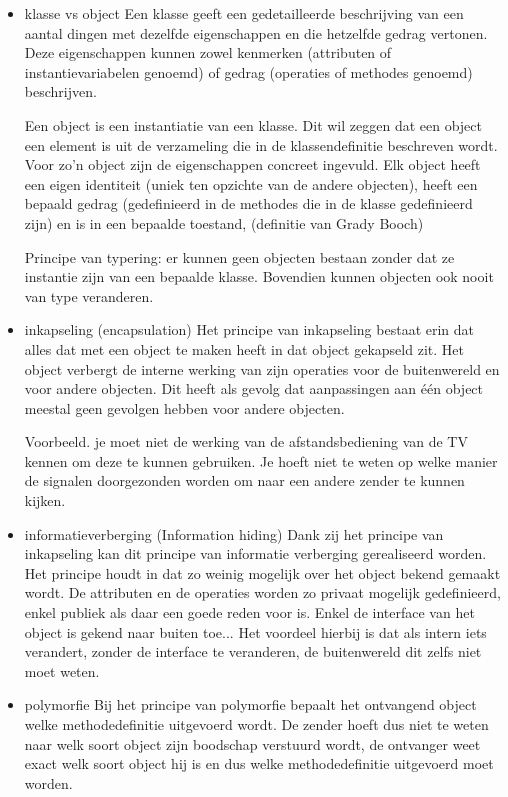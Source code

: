 \begin{itemize}
    \item klasse vs object
Een klasse geeft een gedetailleerde beschrijving van een aantal dingen met dezelfde eigenschappen en die hetzelfde gedrag vertonen. Deze eigenschappen kunnen zowel kenmerken (attributen of instantievariabelen genoemd) of gedrag (operaties of methodes genoemd) beschrijven.

Een object is een instantiatie van een klasse. Dit wil zeggen dat een object een element is uit de verzameling die in de klassendefinitie beschreven wordt. Voor zo'n object zijn de eigenschappen concreet ingevuld. Elk object heeft een eigen identiteit (uniek ten opzichte van de andere objecten), heeft een bepaald gedrag (gedefinieerd in de methodes die in de klasse gedefinieerd zijn) en is in een bepaalde toestand, (definitie van Grady Booch)

Principe van typering: er kunnen geen objecten bestaan zonder dat ze instantie zijn van een bepaalde klasse. Bovendien kunnen objecten ook nooit van type veranderen.
    \item inkapseling (encapsulation)
Het principe van inkapseling bestaat erin dat alles dat met een object te maken heeft in dat object gekapseld zit. Het object verbergt de interne werking van zijn operaties voor de buitenwereld en voor andere objecten. Dit heeft als gevolg dat aanpassingen aan één object meestal geen gevolgen hebben voor andere objecten.

Voorbeeld. je moet niet de werking van de afstandsbediening van de TV kennen om deze te kunnen gebruiken. Je hoeft niet te weten op welke manier de signalen doorgezonden worden om naar een andere zender te kunnen kijken.
    \item informatieverberging (Information hiding)
Dank zij het principe van inkapseling kan dit principe van informatie verberging gerealiseerd worden. Het principe houdt in dat zo weinig mogelijk over het object bekend gemaakt wordt. De attributen en de operaties worden zo privaat mogelijk gedefinieerd, enkel publiek als daar een goede reden voor is. Enkel de interface van het object is gekend naar buiten toe...
Het voordeel hierbij is dat als intern iets verandert, zonder de interface te veranderen, de buitenwereld dit zelfs niet moet weten.
    \item polymorfie
Bij het principe van polymorfie bepaalt het ontvangend object welke methodedefinitie uitgevoerd wordt. De zender hoeft dus niet te weten naar welk soort object zijn boodschap verstuurd wordt, de ontvanger weet exact welk soort object hij is en dus welke methodedefinitie uitgevoerd moet worden.


\end{itemize}
